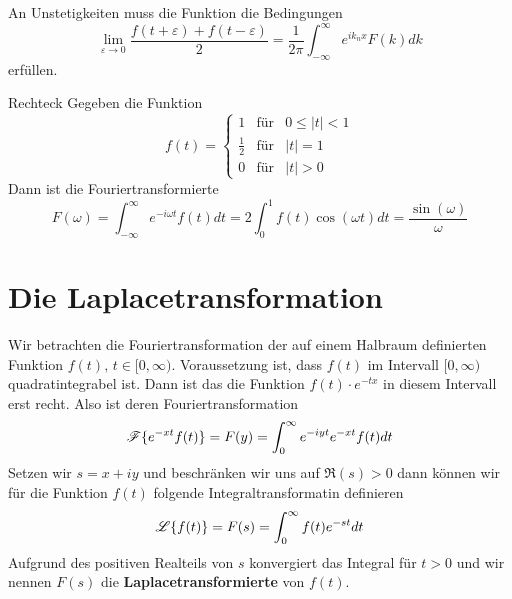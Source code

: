 An Unstetigkeiten muss die Funktion die Bedingungen 
\[
  \lim_{\varepsilon\rightarrow 0}\frac{f(t+\varepsilon)+f(t-\varepsilon)}{2}=
  \frac{1}{2\pi}\int_{-\infty}^{\infty}e^{ik_nx}F(k)dk
\]  
erfüllen.
\begin{example}{Rechteck}
Gegeben die Funktion
  \[  
  f(t)=\left\{
    	\begin{array}{ccl}
    		1&\mbox{f\"ur}&0\le|t|<1\\ 
    		\frac{1}{2}&\mbox{f\"ur}&|t|=1\\
    		0&\mbox{f\"ur}&|t|>0 
         \end{array}
	\right.
\]
Dann ist die Fouriertransformierte
\[
  F(\omega)=\int_{-\infty}^{\infty}e^{-i\omega t}f(t)dt=
  2\int_{0}^{1}f(t)\cos(\omega t)dt=\frac{\sin(\omega)}{\omega}
\]
\end{example}
\section{Die Laplacetransformation}
Wir betrachten die Fouriertransformation der auf einem Halbraum definierten
Funktion $f(t)\mbox{, }t\in[0,\infty)$. Voraussetzung ist, dass $f(t)$ im
Intervall $[0,\infty)$ quadratintegrabel ist. Dann ist das die Funktion
$f(t)\cdot e^{-tx}$ in diesem Intervall erst recht. Also ist deren
Fouriertransformation
\begin{equation}\label{eq:prelaplacetrafo}
{\cal F}\{e^{-xt}f(t)\}=F(y)=\int_0^\infty e^{-iyt}e^{-xt}f(t)dt
\end{equation}
Setzen wir $s=x+iy$ und beschränken wir uns auf $\Re(s)>0$ dann können wir für die 
Funktion $f(t)$ folgende Integraltransformatin definieren 
\begin{equation}\label{eq:Laplacetrafo}
  {\cal L}\{f(t)\}=F(s)=\int_0^\infty f(t) e^{-st}dt
\end{equation}
Aufgrund des positiven Realteils von $s$ konvergiert das Integral für $t>0$
und wir nennen $F(s)$ die {\bf Laplacetransformierte} von $f(t)$.

